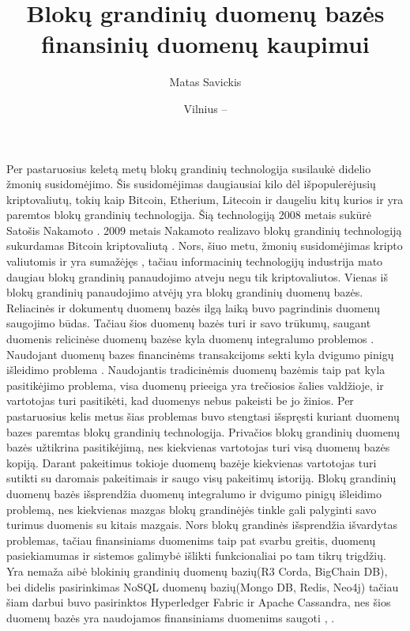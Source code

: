 \documentclass{VUMIFPSkursinis}
\title{Blokų grandinių duomenų bazės finansinių duomenų kaupimui}
\author{Matas Savickis}
\date{Vilnius – \the\year}
\begin{document}
\maketitle


\tableofcontents

Per pastaruosius keletą metų blokų grandinių technologija susilaukė didelio žmonių susidomėjimo. 
Šis susidomėjimas daugiausiai kilo dėl išpopulerėjusių kriptovaliutų, tokių kaip Bitcoin, Etherium, Litecoin ir daugeliu kitų 
kurios ir yra paremtos blokų grandinių technologija. Šią technologiją 2008 metais sukūrė Satošis Nakamoto  \cite{BlockChain}. 
2009 metais Nakamoto realizavo blokų grandinių technologiją sukurdamas Bitcoin kriptovaliutą \cite{Bitcoin}. 
Nors, šiuo metu, žmonių susidomėjimas kripto valiutomis ir yra sumažėjęs \cite{Trends}, tačiau informacinių technologijų industrija 
mato daugiau blokų grandinių panaudojimo atveju negu tik kriptovaliutos. Vienas iš blokų grandinių panaudojimo atvėjų yra 
blokų grandinių duomenų bazės. Reliacinės ir dokumentų duomenų bazės ilgą laiką buvo pagrindinis duomenų saugojimo būdas. 
Tačiau šios duomenų bazės turi ir savo trūkumų, saugant duomenis relicinėse duomenų bazėse kyla duomenų integralumo problemos \cite{Integrity}
. 
Naudojant duomenų bazes financinėms transakcijoms sekti kyla dvigumo pinigų išleidimo problema\cite{Double}
. Naudojantis tradicinėmis duomenų bazėmis 
taip pat kyla pasitikėjimo problema, visa duomenų prieeiga yra trečiosios šalies valdžioje, ir vartotojas turi pasitikėti, kad duomenys nebus pakeisti be jo žinios.
Per pastaruosius kelis metus šias problemas
 buvo stengtasi išspręsti kuriant duomenų bazes paremtas blokų grandinių technologija. Privačios blokų grandinių duomenų bazės užtikrina pasitikėjimą, nes kiekvienas vartotojas turi visą duomenų 
bazės kopiją. Darant pakeitimus tokioje duomenų bazėje kiekvienas vartotojas turi sutikti su daromais pakeitimais ir saugo visų pakeitimų istoriją. Blokų grandinių duomenų bazės išsprendžia duomenų integralumo ir
dvigumo pinigų išleidimo problemą, nes kiekvienas mazgas blokų grandinėjės tinkle gali palyginti savo turimus duomenis su kitais mazgais. 
Nors blokų grandinės išsprendžia išvardytas problemas, tačiau finansiniams duomenims taip pat svarbu greitis, duomenų pasiekiamumas ir sistemos galimybė išlikti funkcionaliai po tam tikrų trigdžių. 
Yra nemaža aibė blokinių grandinių duomenų bazių(R3 Corda, BigChain DB), bei didelis pasirinkimas NoSQL duomenų bazių(Mongo DB, Redis, Neo4j) tačiau šiam darbui buvo pasirinktos
Hyperledger Fabric ir Apache Cassandra, nes šios duomenų bazės yra naudojamos finansiniams duomenims saugoti \cite{BnkH} , \cite{BnkC}.
\end{document}
